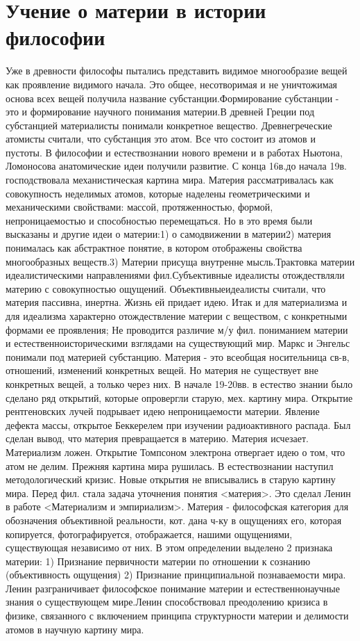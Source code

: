 \documentclass[12pt]{article}
\begin{document}
\section{Учение о материи в истории философии}
Уже в древности философы пытались представить  видимое многообразие вещей как проявление видимого
начала.  Это  общее,  несотворимая   и  не  уничтожимая  основа  всех  вещей  получила  название
субстанции.Формирование субстанции - это и формирование научного понимания материи.В древней Греции
под  субстанцией   материалисты  понимали  конкретное  вещество.  Древнегреческие  атомисты  считали,  что
субстанция это атом. Все что состоит из атомов и пустоты. В философии и естествознании нового времени и в
работах Ньютона, Ломоносова анатомические идеи получили развитие.
 С конца 16в.до начала 19в. господствовала механистическая картина мира. Материя рассматривалась  как
совокупность неделимых атомов, которые наделены геометрическими и механическими  свойствами: массой,
протяженностью, формой, непроницаемостью и способностью перемещаться.
Но в это время были высказаны и другие идеи о материи:1) о самодвижении в материи2) материя понималась
как  абстрактное  понятие,  в  котором  отображены  свойства  многообразных   веществ.3)  Материи  присуща
внутренне  мысль.Трактовка  материи  идеалистическими  направлениями   фил.Субъективные  идеалисты
отождествляли материю с совокупностью ощущений. Объективныеидеалисты считали, что материя пассивна,
инертна. Жизнь ей придает идею. Итак и для материализма  и для идеализма характерно отождествление
материи с веществом, с конкретными формами ее проявления; Не проводится различие м/у фил. пониманием
материи  и  естественноисторическими   взглядами  на  существующий  мир.  Маркс  и  Энгельс  понимали  под
материей субстанцию.
  Материя  -  это  всеобщая  носительница  св-в,  отношений,  изменений  конкретных  вещей.   Но  материя  не
существует вне конкретных вещей, а только через них. В начале 19-20вв. в естество знании было сделано ряд
открытий, которые опровергли старую, мех. картину мира. Открытие рентгеновских лучей подрывает идею
непроницаемости  материи.  Явление   дефекта  массы,   открытое  Беккерелем  при  изучении  радиоактивного
распада. Был сделан  вывод, что материя превращается в материю. Материя исчезает. Материализм ложен.
Открытие Томпсоном электрона отвергает идею о том, что атом не делим. Прежняя картина мира рушилась. В
естествознании наступил методологический кризис. Новые открытия не вписывались в старую картину мира.
Перед фил. стала задача уточнения понятия <материя>.
  Это  сделал  Ленин  в  работе  <Материализм  и  эмпириализм>.   Материя    -  философская  категория   для
обозначения объективной реальности, кот. дана ч-ку в ощущениях его, которая копируется, фотографируется,
отображается, нашими ощущениями,  существующая независимо  от  них.   В  этом  определении выделено 2
признака материи:
1) Признание первичности материи по отношении к сознанию (объективность ощущения) 
2) Признание принципиальной познаваемости мира. Ленин разграничивает философское понимание материи и
естественнонаучные  знания   о  существующем  мире.Ленин  способствовал  преодолению  кризиса  в  физике,
связанного с включением принципа структурности материи и делимости атомов в научную картину мира.
\end{document}
